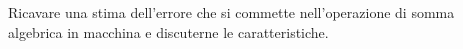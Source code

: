 Ricavare una stima dell'errore che si commette nell'operazione di 
somma algebrica in macchina e discuterne le caratteristiche.
